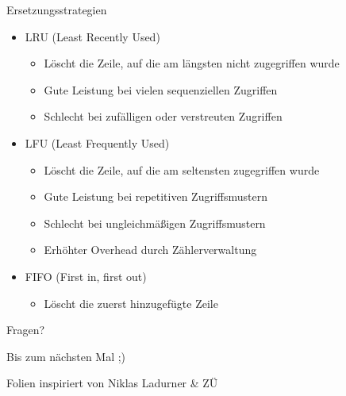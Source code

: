 \documentclass[
  german,            %
  aspectratio=169,    %
]{tumbeamer}
\begin{document}
\begin{frame}{Ersetzungsstrategien}
  \begin{itemize}
      \item LRU (Least Recently Used)
      \begin{itemize}
        \item Löscht die Zeile, auf die am längsten nicht zugegriffen wurde
        \item Gute Leistung bei vielen sequenziellen Zugriffen
        \item Schlecht bei zufälligen oder verstreuten Zugriffen
      \end{itemize}
      \item LFU (Least Frequently Used)
      \begin{itemize}
        \item Löscht die Zeile, auf die am seltensten zugegriffen wurde
        \item Gute Leistung bei repetitiven Zugriffsmustern
        \item Schlecht bei ungleichmäßigen Zugriffsmustern
        \item Erhöhter Overhead durch Zählerverwaltung
      \end{itemize}
      \item FIFO (First in, first out)
      \begin{itemize}
        \item Löscht die zuerst hinzugefügte Zeile
      \end{itemize}
  \end{itemize}
\end{frame}

\begin{frame}[c]{}{}
  \begin{center}
    \LARGE Fragen?
  \end{center}
  \vspace{0.5cm}
  \begin{center}
    \LARGE Bis zum nächsten Mal ;) \\
  \end{center}
  \vspace{1.0cm}
  \begin{center}
    \small Folien inspiriert von Niklas Ladurner \& ZÜ
  \end{center}
\end{frame}
\end{document}
